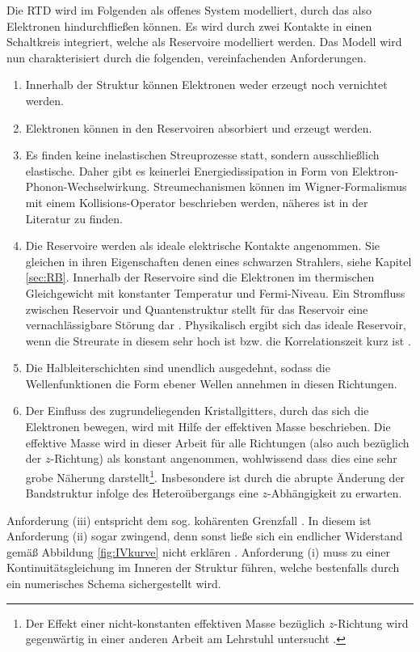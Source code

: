 Die RTD wird im Folgenden als offenes System modelliert, durch das also Elektronen hindurchfließen können. Es wird durch zwei Kontakte in einen Schaltkreis integriert, welche als Reservoire modelliert werden. Das Modell wird nun charakterisiert durch die folgenden, vereinfachenden Anforderungen.
\begin{enumerate}[label=(\roman*)]
  \item Innerhalb der Struktur können Elektronen weder erzeugt noch vernichtet werden.
  \item Elektronen können in den Reservoiren absorbiert und erzeugt werden.
  \item Es finden keine inelastischen Streuprozesse statt, sondern ausschließlich elastische. Daher gibt es keinerlei Energiedissipation in Form von Elektron-Phonon-Wechselwirkung. Streumechanismen können im Wigner-Formalismus mit einem Kollisions-Operator beschrieben werden, näheres ist in der Literatur \cite{wiedenhaus} zu finden.
  \item Die Reservoire werden als ideale elektrische Kontakte angenommen. Sie gleichen in ihren Eigenschaften denen eines schwarzen Strahlers, siehe Kapitel \ref{sec:RB}. Innerhalb der Reservoire sind die Elektronen im thermischen Gleichgewicht mit konstanter Temperatur und Fermi-Niveau. Ein Stromfluss zwischen Reservoir und Quantenstruktur stellt für das Reservoir eine vernachlässigbare Störung dar \cite{frensley3}. Physikalisch ergibt sich das ideale Reservoir, wenn die Streurate in diesem sehr hoch ist bzw. die Korrelationszeit kurz ist \cite{frensley3}.
  \item Die Halbleiterschichten sind unendlich ausgedehnt, sodass die Wellenfunktionen die Form ebener Wellen annehmen in diesen Richtungen.
  \item Der Einfluss des zugrundeliegenden Kristallgitters, durch das sich die Elektronen bewegen, wird mit Hilfe der effektiven Masse beschrieben. Die effektive Masse wird in dieser Arbeit für alle Richtungen (also auch bezüglich der $z$-Richtung) als konstant angenommen, wohlwissend dass dies eine sehr grobe Näherung darstellt\footnote{Der Effekt einer nicht-konstanten effektiven Masse bezüglich $z$-Richtung wird gegenwärtig in einer anderen Arbeit am Lehrstuhl untersucht .}. Insbesondere ist durch die abrupte Änderung der Bandstruktur infolge des Heteroübergangs eine $z$-Abhängigkeit zu erwarten.
\end{enumerate}
Anforderung (iii) entspricht dem sog. kohärenten Grenzfall \cite{failure}. In diesem ist Anforderung (ii) sogar zwingend, denn sonst ließe sich ein endlicher Widerstand gemäß Abbildung \ref{fig:IVkurve} nicht erklären \cite{landauer}. Anforderung (i) muss zu einer Kontinuitätsgleichung im Inneren der Struktur führen, welche bestenfalls durch ein numerisches Schema sichergestellt wird. 

